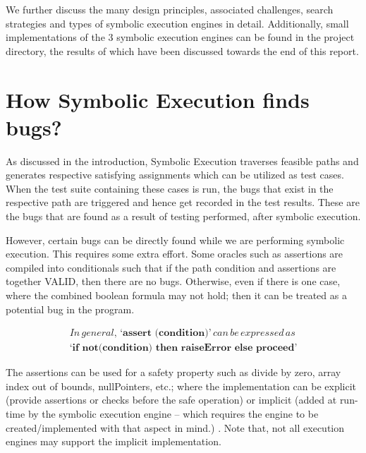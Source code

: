 \documentclass[11pt]{llncs}
\begin{document}
	\vspace{2mm}

We further discuss the many design principles, associated challenges, search strategies and types of symbolic execution engines in detail. Additionally, small implementations of the 3 symbolic execution engines can be found in the project directory, the results of which have been discussed towards the end of this report.




\section{How Symbolic Execution finds bugs?}
	As discussed in the introduction, Symbolic Execution traverses feasible paths and generates respective satisfying assignments which can be utilized as test cases. When the test suite containing these cases is run, the bugs that exist in the respective path are triggered and hence get recorded in the test results. \cite{7_UW_SE} These are the bugs that are found as a result of testing performed, after symbolic execution.

	However, certain bugs can be directly found while we are performing symbolic execution. This requires some extra effort. Some oracles such as assertions are compiled into conditionals such that if the path condition and assertions are together VALID, then there are no bugs. Otherwise, even if there is one case, where the combined boolean formula may not hold; then it can be treated as a potential bug in the program. \cite{7_UW_SE}
	
	\begin{equation}
		\begin{split}
			In \, general, \, \textbf{‘assert (condition)’}  \, can \, be \, expressed \, as \, \\
			 \textbf{‘if not(condition) then raiseError else proceed’} 
		\end{split}
	\end{equation}
	
	
	The assertions can be used for a safety property such as divide by zero, array index out of bounds, nullPointers, etc.; where the implementation can be explicit (provide assertions or checks before the safe operation) or implicit (added at run-time by the symbolic execution engine – which requires the engine to be created/implemented with that aspect in mind.) \cite{7_UW_SE}. Note that, not all execution engines may support the implicit implementation.
\end{document}
